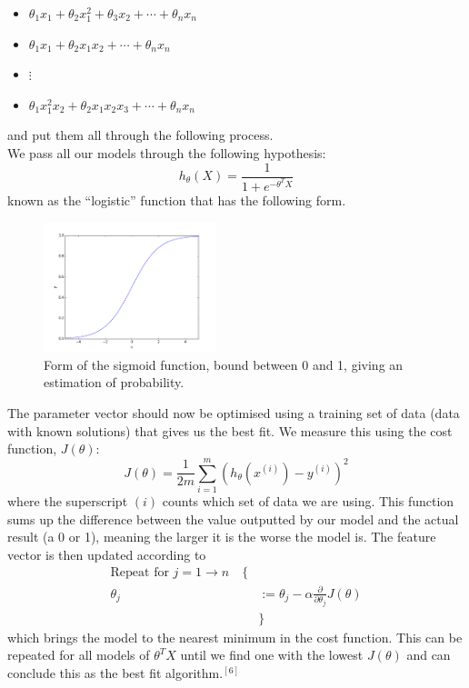 \documentclass[11pt, a4paper]{article}
\begin{document}
\begin{multicols}{2}
\begin{itemize}
\item$\theta_1 x_1 + \theta_2 x_1^2 + \theta_3 x_2 + \cdots + \theta_n x_n$
\item$\theta_1 x_1 + \theta_2 x_1x_2 + \cdots + \theta_n x_n$
\item$\vdots$
\item$\theta_1 x_1^2x_2 + \theta_2 x_1x_2x_3 + \cdots + \theta_n x_n$
\end{itemize}and put them all through the following process.\\
We pass all our models through the following hypothesis:
\begin{equation*}
h_\theta(X) = \frac{1}{1+e^{-\theta^TX}}
\end{equation*}
known as the ``logistic'' function that has the following form.
\begin{figure}[H]
\includegraphics[width = 5cm]{sigmoid}
\centering
\caption{\footnotesize Form of the sigmoid function, bound between 0 and 1, giving an estimation of probability.}
\end{figure}
The parameter vector should now be optimised using a training set of data (data with known solutions) that gives us the best fit. We measure this using the cost function, $J(\theta)$:
\begin{equation*}
 J(\theta) = \frac{1}{2m}\sum^m_{i=1}(h_\theta(x^{(i)})-y^{(i)})^2
 \end{equation*}
 where the superscript $(i)$ counts which set of data we are using. This function sums up the difference between the value outputted by our model and the actual result (a 0 or 1), meaning the larger it is the worse the model is. The feature vector is then updated according to
\begin{equation*}
\begin{aligned}
\text{Repeat for } j=1 \to n \quad \{ & \\
 \theta_j &:= \theta_j - \alpha \frac{\partial}{\partial \theta_j} J(\theta) \\
& \}
\end{aligned}
\end{equation*}
which brings the model to the nearest minimum in the cost function. This can be repeated for all models of $\theta^TX$ until we find one with the lowest $J(\theta)$ and can conclude this as the best fit algorithm.$^{[6]}$

\end{multicols}
\end{document}
